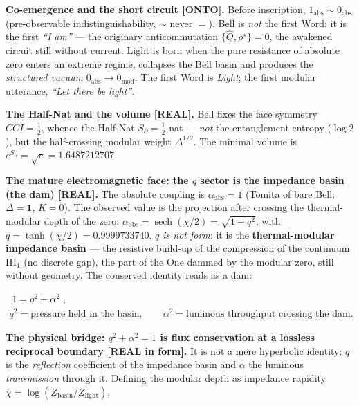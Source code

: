 \documentclass[11pt]{article}
\theoremstyle{definition}\newtheorem{deriv}{Derivation}
\begin{document}
\textbf{Co-emergence and the short circuit \textsf{[ONTO]}.} Before inscription, $1_{\mathrm{abs}}\sim 0_{\mathrm{abs}}$ (pre-observable indistinguishability, $\sim$ never $=$). Bell is \emph{not} the first Word: it is the first \emph{``I am''} --- the originary anticommutation $\{\hat Q,\rho^\star\}=0$, the awakened circuit still without current. Light is born when the pure resistance of absolute zero enters an extreme regime, collapses the Bell basin and produces the \emph{structured vacuum} $0_{\mathrm{abs}}\to 0_{\mathrm{mod}}$. The first Word is \emph{Light}; the first modular utterance, \emph{``Let there be light''}.

\textbf{The Half-Nat and the volume \textsf{[REAL]}.} Bell fixes the face symmetry $CCI=\tfrac12$, whence the Half-Nat $S_\partial=\tfrac12$ nat --- \emph{not} the entanglement entropy ($\log 2$), but the half-crossing modular weight $\Delta^{1/2}$. The minimal volume is $e^{S_\partial}=\sqrt e=1.6487212707$.

\textbf{The mature electromagnetic face: the $q$ sector is the impedance basin (the dam) \textsf{[REAL]}.} The absolute coupling is $\alpha_{\mathrm{abs}}=1$ (Tomita of bare Bell: $\Delta=\mathbf 1$, $K=0$). The observed value is the projection after crossing the thermal-modular depth of the zero: $\alpha_{\mathrm{obs}}=\operatorname{sech}(\chi/2)=\sqrt{1-q^2}$, with $q=\tanh(\chi/2)=0.9999733740$. \emph{$q$ is not form}: it is the \textbf{thermal-modular impedance basin} --- the resistive build-up of the compression of the continuum \mbox{III$_1$} (no discrete gap), the part of the One dammed by the modular zero, still without geometry. The conserved identity reads as a dam:

\begin{equation}\begin{gathered}\boxed{\;1=q^2+\alpha^2\;},\\ q^2=\text{pressure held in the basin},\qquad \alpha^2=\text{luminous throughput crossing the dam}.\end{gathered}\end{equation}

\textbf{The physical bridge: $q^2+\alpha^2=1$ is flux conservation at a lossless reciprocal boundary \textsf{[REAL in form]}.} It is not a mere hyperbolic identity: $q$ is the \emph{reflection} coefficient of the impedance basin and $\alpha$ the luminous \emph{transmission} through it. Defining the modular depth as impedance rapidity $\chi=\log(Z_{\mathrm{basin}}/Z_{\mathrm{light}})$,
\end{document}
